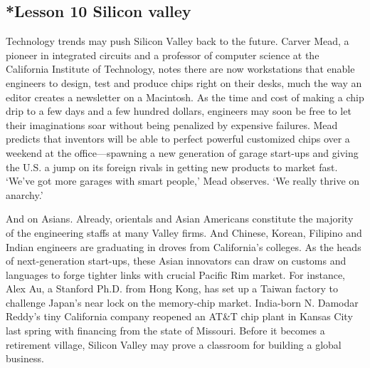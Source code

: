 \documentclass[kindlepaper]{BHCexam4kindle}
\begin{document}
\subsection{*Lesson 10 Silicon valley}
\par
Technology trends may push Silicon Valley back to the future. Carver Mead, a pioneer in integrated circuits
and a professor of computer science at the California Institute of Technology, notes there are now workstations
that enable engineers to design, test and produce chips right on their desks, much the way an editor creates a
newsletter on a Macintosh. As the time and cost of making a chip drip to a few days and a few hundred dollars,
engineers may soon be free to let their imaginations soar without being penalized by expensive failures. Mead
predicts that inventors will be able to perfect powerful customized chips over a weekend at the
office—spawning a new generation of garage start-ups and giving the U.S. a jump on its foreign rivals in
getting new products to market fast. ‘We've got more garages with smart people,' Mead observes. ‘We really
thrive on anarchy.'
\par
And on Asians. Already, orientals and Asian Americans constitute the majority of the engineering staffs at
many Valley firms. And Chinese, Korean, Filipino and Indian engineers are graduating in droves from
California's colleges. As the heads of next-generation start-ups, these Asian innovators can draw on customs
and languages to forge tighter links with crucial Pacific Rim market. For instance, Alex Au, a Stanford Ph.D.
from Hong Kong, has set up a Taiwan factory to challenge Japan's near lock on the memory-chip market.
India-born N. Damodar Reddy's tiny California company reopened an AT&T chip plant in Kansas City last
spring with financing from the state of Missouri. Before it becomes a retirement village, Silicon Valley may
prove a classroom for building a global business.
\clearpage
\end{document}
